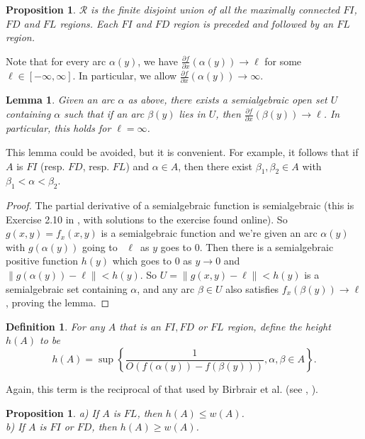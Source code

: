 \documentclass[article]{amsart}
\newtheorem{lemma}[theorem]{Lemma}
\newtheorem{proposition}[theorem]{Proposition}
\newtheorem{definition}[theorem]{Definition}
\newcommand{\0}{{\bf 0}}
\begin{document}
\begin{proposition}
$\mathcal{R}$ is the finite disjoint union of all the maximally connected $FI$, $FD$ and $FL$ regions.  Each $FI$ and $FD$ region is preceded and followed by an $FL$ region.
\end{proposition}

Note that for every arc $\alpha (y)$, we have $\frac{\partial f}{\partial x} (\alpha (y))\rightarrow \ell$ for some $\ell \in [-\infty,\infty ]$.  In particular, we allow $\frac{\partial f}{\partial x}(\alpha(y)) \rightarrow \infty$.


\begin{lemma} Given an arc $\alpha$ as above, there exists a semialgebraic  open set $U$ containing $\alpha$   such that if an arc $\beta(y)$ lies in $U$, then $\frac{\partial f}{\partial x}(\beta(y)) \rightarrow \ell$.  In particular, this holds for $\ell = \infty$.
\end{lemma}

This lemma could be avoided, but it is convenient.  For example, it follows that if $A$ is $FI$ (resp. $FD$, resp. $FL$) and $\alpha \in A$, then there exist $\beta_1, \beta_2 \in A$ with $\beta_1 < \alpha < \beta_2$.

\begin{proof} The partial derivative of a semialgebraic function is semialgebraic (this is  Exercise 2.10 in \cite{C}, with solutions to the exercise found online).  So $g(x,y) = f_x(x,y)$ is a semialgebraic function and we're given an arc $\alpha(y)$ with $g(\alpha(y))$ going to
\ $\ell$\ as $y$ goes to $0$.  Then there is a semialgebraic positive function $h(y)$ which goes to $0$ as $y\rightarrow 0$ and 
$\| g(\alpha(y))  - \ell \|< h(y)$.  So $U = \|g(x,y)- \ell \|<h(y)$ is a semialgebraic set containing $\alpha$, and any arc $\beta \in  U$ also satisfies $f_x(\beta(y)) \rightarrow \ell$, proving the lemma.  \end{proof}


\begin{definition} For any $A$ that is an $FI, FD$ or $FL$ region, define the 
height $h(A)$ to be
$$
h(A) = \sup \left\{ \frac{1}{O(f(\alpha(y))-f(\beta(y))) }, \alpha, \beta \in A\right\}.
$$
\end{definition}
\noindent Again, this term is the reciprocal of that used by Birbrair et al. (see \cite{BG1}, \cite{BG2}).

\begin{proposition}
a)  If $A$ is $FL$, then $h(A) \le w(A)$.\\
b) If $A$ is $FI$ or $FD$, then $h(A) \ge w(A)$.
\end{proposition}
\end{document}
